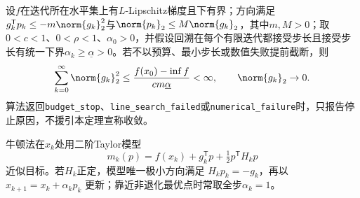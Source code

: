 
\begin{theorem}[Armijo梯度法的一阶收敛条件]
设$f$在迭代所在水平集上有$L$-Lipschitz梯度且下有界；方向满足
$g_k^{\mathsf T}p_k\le-m\norm{g_k}_2^2$与$\norm{p_k}_2\le M\norm{g_k}_2$，其中$m,M>0$；取$0<c<1$、$0<\rho<1$、$\alpha_0>0$，并假设回溯在每个有限迭代都接受步长且接受步长有统一下界$\alpha_k\ge\underline\alpha>0$。若不以预算、最小步长或数值失败提前截断，则
\[
\sum_{k=0}^{\infty}\norm{g_k}_2^2
\le\frac{f(x_0)-\inf f}{c m\underline\alpha}<\infty,
\qquad \norm{g_k}_2\to0.
\]
算法返回\texttt{budget\_stop}、\texttt{line\_search\_failed}或\texttt{numerical\_failure}时，只报告停止原因，不援引本定理宣称收敛。
\end{theorem}


牛顿法在$x_k$处用二阶Taylor模型
\[
m_k(p)=f(x_k)+g_k^{\mathsf T}p+\tfrac12p^{\mathsf T}H_kp
\]
近似目标。若$H_k$正定，模型唯一极小方向满足 $H_kp_k=-g_k$，再以 $x_{k+1}=x_k+\alpha_kp_k$ 更新；靠近非退化最优点时常取全步$\alpha_k=1$。


